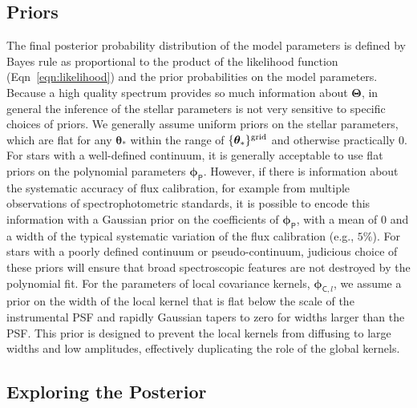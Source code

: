 \documentclass[iop,floatfix]{emulateapj}
\newcommand{\vt}{ {\bm \theta}}
\newcommand{\vT}{ {\bm \Theta}}
\newcommand{\vp}{ {\bm \phi}}
\newcommand{\cheb}{ \vp_{\mathsf{P}}}
\begin{document}
\subsection{Priors} \label{subsec:priors}
The final posterior probability distribution of the model parameters is defined by Bayes rule as proportional to the product of the likelihood function (Eqn~\ref{eqn:likelihood}) and the prior probabilities on the model parameters. Because a high quality spectrum provides so much information about $\vT$, in general the inference of the stellar parameters is not very sensitive to specific choices of priors.  We generally assume uniform priors on the stellar parameters, which are flat for any $\vt_{\ast}$ within the range of $\{\vt_{\ast}\}^{\rm grid}$ and otherwise practically $0$. For stars with a well-defined continuum, it is generally acceptable to use flat priors on the polynomial parameters $\cheb$. However, if there is information about the systematic accuracy of flux calibration, for example from multiple observations of spectrophotometric standards, it is possible to encode this information with a Gaussian prior on the coefficients of $\cheb$, with a mean of $0$ and a width of the typical systematic variation of the flux calibration (e.g., $5\%$). For stars with a poorly defined continuum or pseudo-continuum, judicious choice of these priors will ensure that broad spectroscopic features are not destroyed by the polynomial fit. For the parameters of local covariance kernels, $\vp_{{\mathsf C},l}$, we assume a prior on the width of the local kernel that is flat below the scale of the instrumental PSF and rapidly Gaussian tapers to zero for widths larger than the PSF. This prior is designed to prevent the local kernels from diffusing to large widths and low amplitudes, effectively duplicating the role of the global kernels.

\subsection{Exploring the Posterior} \label{subsec:MCMC}
\end{document}
